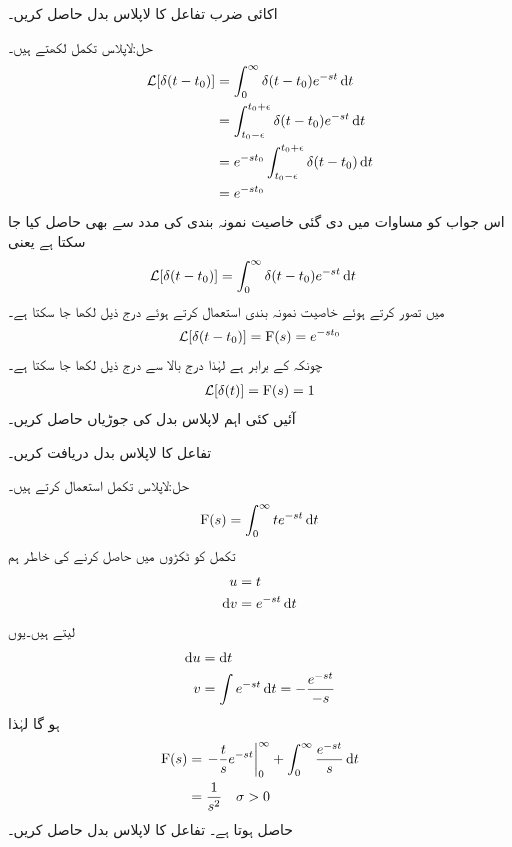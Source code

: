 اکائی ضرب تفاعل کا لاپلاس بدل حاصل کریں۔

حل:لاپلاس تکمل لکھتے ہیں۔
\begin{align*}
\Laplace[\delta(t-t_0)]&=\int_0^{\infty} \delta(t-t_0) e^{-st} \dif t\\
&=\int_{t_0-\epsilon}^{t_0+\epsilon} \delta(t-t_0) e^{-st} \dif t\\
&=e^{-s t_0} \int_{t_0-\epsilon}^{t_0+\epsilon} \delta(t-t_0) \dif t\\
&=e^{-st_0}
\end{align*}
اس جواب  کو مساوات  میں دی گئی خاصیت نمونہ بندی کی مدد سے بھی حاصل کیا جا سکتا ہے یعنی
  \begin{align*}
\Laplace[\delta(t-t_0)]&=\int_0^{\infty} \delta(t-t_0) e^{-st} \dif t
\end{align*}
میں  تصور کرتے ہوئے خاصیت نمونہ بندی استعمال کرتے  ہوئے درج ذیل لکھا جا سکتا ہے۔
\begin{align}
\mathcal{L}[\delta(t-t_0)]={{\textup{F}}}(s)=e^{-st_0}
\end{align}
چونکہ  کے برابر ہے لہٰذا درج بالا سے درج ذیل لکھا جا سکتا ہے۔
\begin{align}
\mathcal{L}[\delta(t)]={{\textup{F}}}(s)=1
\end{align}
آئیں کئی اہم لاپلاس بدل کی جوڑیاں حاصل کریں۔

تفاعل  کا لاپلاس بدل دریافت کریں۔

حل:لاپلاس تکمل استعمال کرتے ہیں۔
\begin{align*}
\bF(s)=\int_0^{\infty} t e^{-st} \dif t
\end{align*}
تکمل کو ٹکڑوں میں حاصل کرنے کی خاطر ہم 
\begin{align*}
u&=t\\
\dif v&=e^{-st} \dif t
\end{align*}
 لیتے ہیں۔یوں
\begin{align*}
\dif u &= \dif t\\
v&=\int e^{-st} \dif t=-\frac{e^{-st}}{-s}
\end{align*}
ہو گا لہٰذا
\begin{gather}
\begin{aligned}
\bF(s)&=\left. -\frac{t}{s}e^{-st}\right|_0^{\infty}+\int_0^{\infty} \frac{e^{-st}}{s} \dif t\\
&=\frac{1}{s^2} \quad \sigma>0
\end{aligned}
\end{gather}
حاصل ہوتا ہے۔
تفاعل  کا لاپلاس بدل حاصل کریں۔


